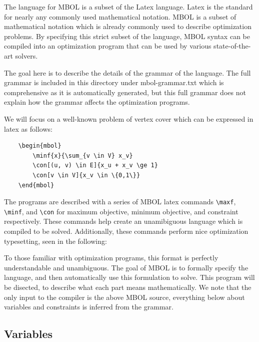\documentclass{article}
\begin{document}
The language for MBOL is a subset of the Latex language. Latex is the standard for nearly any commonly used mathematical notation. MBOL is a subset of mathematical notation which is already commonly used to describe optimization problems. By specifying this strict subset of the language, MBOL syntax can be compiled into an optimization program that can be used by various state-of-the-art solvers.

The goal here is to describe the details of the grammar of the language. The full grammar is included in this directory under mbol-grammar.txt which is comprehensive as it is automatically generated, but this full grammar does not explain how the grammar affects the optimization programs.


We will focus on a well-known problem of vertex cover which can be expressed in latex as follows:

\begin{verbatim}
    \begin{mbol}
        \minf{x}{\sum_{v \in V} x_v}
        \con[(u, v) \in E]{x_u + x_v \ge 1}
        \con[v \in V]{x_v \in \{0,1\}}
    \end{mbol}
\end{verbatim}

The programs are described with a series of MBOL latex commands \texttt{\textbackslash maxf}, \texttt{\textbackslash minf}, and \texttt{\textbackslash con} for maximum objective, minimum objective, and constraint respectively. These commands help create an unamibiguous language which is compiled to be solved. Additionally, these commands perform nice optimization typesetting, seen in the following:

\begin{mbol}
\end{mbol}

To those familiar with optimization programs, this format is perfectly understandable and unambiguous. The goal of MBOL is to formally specify the language, and then automatically use this formulation to solve. This program will be disected, to describe what each part means mathematically. We note that the only input to the compiler is the above MBOL source, everything below about variables and constraints is inferred from the grammar.

\subsection{Variables}
\end{document}
